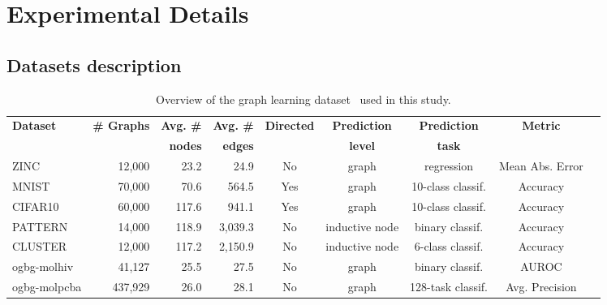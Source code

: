 \documentclass{article}
\begin{document}
\section{Experimental Details}\label{app:exp_details}
\setcounter{figure}{0}
\setcounter{table}{0}

\subsection{Datasets description}
\label{app:datasets}

\begin{table}[h]
    \caption{Overview of the graph learning dataset~\cite{dwivedi2020benchmarking,hu2020ogb,hu2021ogblsc,freitas2021malnet,dwivedi2022LRGB} used in this study.}
    \label{tab:ds_summary}
    \begin{adjustwidth}{-2.5 cm}{-2.5 cm}
    \setlength\tabcolsep{4pt} %
    \centering
    \footnotesize
    \begin{tabular}{lrrrccccc}\toprule
    \multirow{2}{*}{\textbf{Dataset}} &\multirow{2}{*}{\textbf{\# Graphs}} &\textbf{Avg. \#} &\textbf{Avg. \#} &\multirow{2}{*}{\textbf{Directed}} &\textbf{Prediction} &\textbf{Prediction} &\multirow{2}{*}{\textbf{Metric}} \\
& &\textbf{nodes} &\textbf{edges} & &\textbf{level} &\textbf{task} & \\\midrule
    ZINC &12,000 &23.2 &24.9 &No &graph &regression &Mean Abs. Error \\
    MNIST &70,000 &70.6 &564.5 &Yes &graph &10-class classif. &Accuracy \\
    CIFAR10 &60,000 &117.6 &941.1 &Yes &graph &10-class classif. &Accuracy \\
    PATTERN &14,000 &118.9 &3,039.3 &No &inductive node &binary classif. &Accuracy \\
    CLUSTER &12,000 &117.2 &2,150.9 &No &inductive node &6-class classif. &Accuracy \\\midrule
    ogbg-molhiv &41,127 &25.5 &27.5 &No &graph &binary classif. &AUROC \\
    ogbg-molpcba &437,929 &26.0 &28.1 &No &graph &128-task classif. &Avg. Precision \\

\end{tabular}
\end{adjustwidth}
\end{table}
\end{document}
